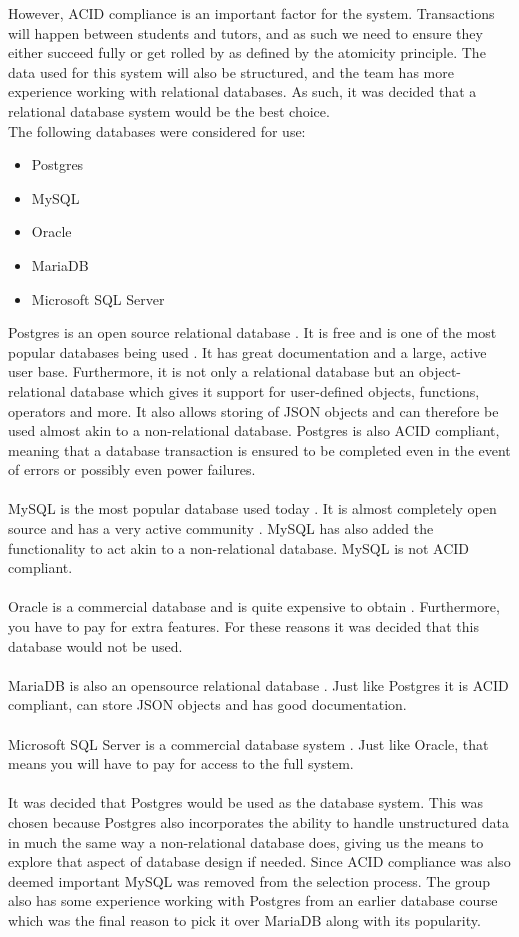 However, ACID compliance is an important factor for the system.
Transactions will happen between students and tutors, and as such we need to ensure they either succeed fully or get rolled by as defined by the atomicity principle.
The data used for this system will also be structured, and the team has more experience working with relational databases.
As such, it was decided that a relational database system would be the best choice.
\\
The following databases were considered for use:
\begin{itemize}
    \item Postgres
    \item MySQL
    \item Oracle
    \item MariaDB
    \item Microsoft SQL Server
\end{itemize}
Postgres is an open source relational database \cite{Postgres}.
It is free and is one of the most popular databases being used \cite{databasePopularity}.
It has great documentation and a large, active user base.
Furthermore, it is not only a relational database but an object-relational database which gives it support for user-defined objects, functions, operators and more.
It also allows storing of JSON objects and can therefore be used almost akin to a non-relational database.
Postgres is also ACID compliant, meaning that a database transaction is ensured to be completed even in the event of errors or possibly even power failures.
\\
\\
MySQL is the most popular database used today \cite{databasePopularity}.
It is almost completely open source and has a very active community \cite{MySQL}.
MySQL has also added the functionality to act akin to a non-relational database.
MySQL is not ACID compliant.
\\
\\
Oracle is a commercial database and is quite expensive to obtain \cite{oracle}.
Furthermore, you have to pay for extra features.
For these reasons it was decided that this database would not be used.
\\
\\
MariaDB is also an opensource relational database \cite{MariaDB}.
Just like Postgres it is ACID compliant, can store JSON objects and has good documentation.
\\
\\
Microsoft SQL Server is a commercial database system \cite{MSSQLSERVER}.
Just like Oracle, that means you will have to pay for access to the full system.
\\
\\
It was decided that Postgres would be used as the database system.
This was chosen because Postgres also incorporates the ability to handle unstructured data in much the same way a non-relational database does, giving us the means to explore that aspect of database design if needed.
Since ACID compliance was also deemed important MySQL was removed from the selection process. 
The group also has some experience working with Postgres from an earlier database course which was the final reason to pick it over MariaDB along with its popularity.

